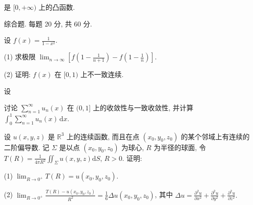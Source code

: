 是 $[0, +\infty)$ 上的凸函数.\par
\par{}
综合题. 每题 20 分, 共 60 分.\par
设 $f(x) = \frac{1}{1 - x^2}$.\par
(1) 求极限 $\lim_{n\to \infty}\left[f\left(1 - \frac{1}{n + 1}\right) - f\left(1 - \frac{1}{n}\right)\right].$\par
(2) 证明: $f(x)$ 在 $[0,1)$ 上不一致连续.\par
\par{}
设\par
\nopagebreak[4]
\displayformula{u _ {n} (x) = x ^ {n} \ln x,   x \in (0, 1 ].}
讨论 $\sum_{n=1}^{\infty} u_n(x)$ 在 $(0,1]$ 上的收敛性与一致收敛性, 并计算 $\int_0^1 \sum_{n=1}^{\infty} u_n(x) \, \mathrm{d}x$.\par
设 $u(x, y, z)$ 是 $\mathbb{R}^3$ 上的连续函数, 而且在点 $(x_0, y_0, z_0)$ 的某个邻域上有连续的二阶偏导数. 记 $\Sigma$ 是以点 $(x_0, y_0, z_0)$ 为球心, $R$ 为半径的球面, 令 $T(R) = \frac{1}{4\pi R^2} \iint_{\Sigma} u(x, y, z) \mathrm{d}S$, $R > 0$. 证明:\par
(1) $\lim_{R\to 0^{+}}T(R) = u(x_0,y_0,z_0)$.\par
(2) $\lim_{R\to 0^{+}}\frac{T(R) - u(x_0,y_0,z_0)}{R^2} = \frac{1}{6}\Delta u(x_0,y_0,z_0)$, 其中 $\Delta u = \frac{\partial^2u}{\partial x^2} +\frac{\partial^2u}{\partial y^2} +\frac{\partial^2u}{\partial z^2}.$\par
